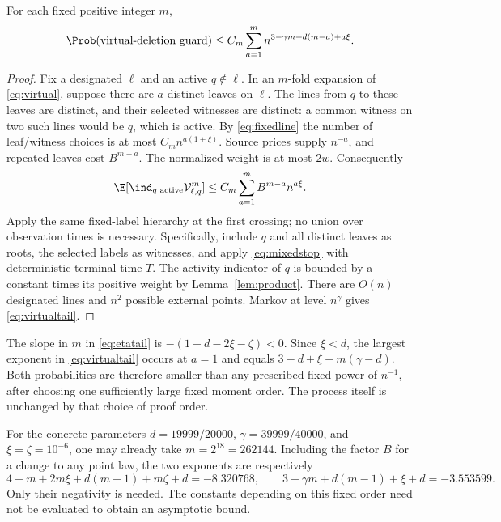 \begin{lemma}\label{lem:virtualtail}
For each fixed positive integer \(m\),
\begin{equation}\label{eq:virtualtail}
 \Prob(\text{virtual-deletion guard})
 \le C_m\sum_{a=1}^m n^{3-\gamma m+d(m-a)+a\xi}.
\end{equation}
\end{lemma}
\begin{proof}
Fix a designated \(\ell\) and an active \(q\notin\ell\).
In an \(m\)-fold expansion of \eqref{eq:virtual}, suppose there are
\(a\) distinct leaves on \(\ell\). The lines from \(q\) to these
leaves are distinct, and their selected witnesses are distinct:
a common witness on two such lines would be \(q\), which is active.
By \eqref{eq:fixedline} the number of leaf/witness choices is at most
\(C_m n^{a(1+\xi)}\). Source prices supply \(n^{-a}\), and repeated
leaves cost \(B^{m-a}\). The normalized weight is at most \(2w\).
Consequently
\[
 \E[\ind_{q\text{ active}}\mathcal V_{\ell,q}^m]
 \le C_m\sum_{a=1}^m B^{m-a}n^{a\xi}.
\]
Apply the same fixed-label hierarchy at the first crossing; no
union over observation times is necessary. Specifically, include
\(q\) and all distinct leaves as roots, the selected labels as
witnesses, and apply \eqref{eq:mixedstop} with deterministic
terminal time \(T\). The activity indicator of \(q\) is bounded
by a constant times its positive weight by Lemma~\ref{lem:product}.
There are \(O(n)\)
designated lines and \(n^2\) possible external points. Markov at
level \(n^\gamma\) gives \eqref{eq:virtualtail}.
\end{proof}

The slope in \(m\) in \eqref{eq:etatail} is
\(-(1-d-2\xi-\zeta)<0\). Since \(\xi<d\), the largest exponent in
\eqref{eq:virtualtail} occurs at \(a=1\) and equals
\(3-d+\xi-m(\gamma-d)\). Both probabilities are therefore smaller
than any prescribed fixed power of \(n^{-1}\), after choosing one
sufficiently large fixed moment order. The process itself is unchanged
by that choice of proof order.

For the concrete parameters
\(d=19999/20000\), \(\gamma=39999/40000\), and
\(\xi=\zeta=10^{-6}\), one may already take
\(m=2^{18}=262144\). Including the factor \(B\) for a change to
any point law, the two exponents are respectively
\[
 4-m+2m\xi+d(m-1)+m\zeta+d=-8.320768,
 \qquad 3-\gamma m+d(m-1)+\xi+d=-3.553599.
\]
Only their negativity is needed. The constants depending on this
fixed order need not be evaluated to obtain an asymptotic bound.



